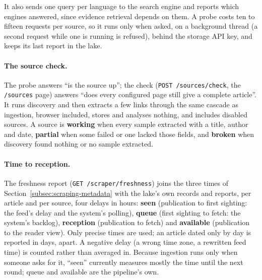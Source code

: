 It also sends one query per language to the search engine and reports
which engines answered, since evidence retrieval depends on them. A
probe costs ten to fifteen requests per source, so it runs only when
asked, on a background thread (a second request while one is running
is refused), behind the storage API key, and keeps its last report in
the lake.

\paragraph{The source check.} The probe answers ``is the source up'';
the check (\texttt{POST /sources/check}, the \texttt{/sources} page)
answers ``does every configured page still give a complete article''.
It runs discovery and then extracts a few links through the same
cascade as ingestion, browser included, stores and analyses nothing,
and includes disabled sources. A source is \textbf{working} when every
sample extracted with a title, author and date, \textbf{partial} when
some failed or one lacked those fields, and \textbf{broken} when
discovery found nothing or no sample extracted.

\paragraph{Time to reception.} The freshness report
(\texttt{GET /scraper/freshness}) joins the three times of
Section~\ref{subsec:scraping-metadata} with the lake's own records and
reports, per article and per source, four delays in hours:
\textbf{seen} (publication to first sighting: the feed's delay and the
system's polling), \textbf{queue} (first sighting to fetch: the
system's backlog), \textbf{reception} (publication to fetch) and
\textbf{available} (publication to the reader view). Only precise times
are used; an article dated only by day is reported in days, apart. A
negative delay (a wrong time zone, a rewritten feed time) is counted
rather than averaged in. Because ingestion runs only when someone asks
for it, ``seen'' currently measures mostly the time until the next
round; queue and available are the pipeline's own.
